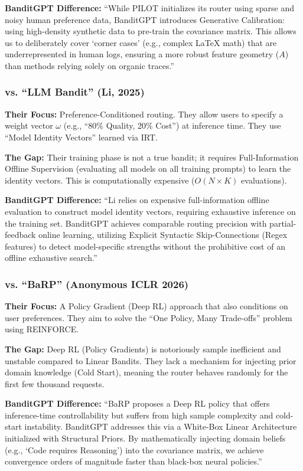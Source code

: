 \noindent \textbf{BanditGPT Difference:}
``While PILOT \cite{panda2025pilot} initializes its router using sparse and noisy human preference data, BanditGPT introduces Generative Calibration: using high-density synthetic data to pre-train the covariance matrix. This allows us to deliberately cover `corner cases' (e.g., complex LaTeX math) that are underrepresented in human logs, ensuring a more robust feature geometry ($A$) than methods relying solely on organic traces.''

\subsubsection{vs. ``LLM Bandit'' (Li, 2025)}
\noindent \textbf{Their Focus:} Preference-Conditioned routing. They allow users to specify a weight vector $\omega$ (e.g., ``80\% Quality, 20\% Cost'') at inference time. They use ``Model Identity Vectors'' learned via IRT.

\noindent \textbf{The Gap:} Their training phase is not a true bandit; it requires Full-Information Offline Supervision (evaluating all models on all training prompts) to learn the identity vectors. This is computationally expensive ($O(N \times K)$ evaluations).

\noindent \textbf{BanditGPT Difference:}
``Li \cite{li2025llmbandit} relies on expensive full-information offline evaluation to construct model identity vectors, requiring exhaustive inference on the training set. BanditGPT achieves comparable routing precision with partial-feedback online learning, utilizing Explicit Syntactic Skip-Connections (Regex features) to detect model-specific strengths without the prohibitive cost of an offline exhaustive search.''

\subsubsection{vs. ``BaRP'' (Anonymous ICLR 2026)}
\noindent \textbf{Their Focus:} A Policy Gradient (Deep RL) approach that also conditions on user preferences. They aim to solve the ``One Policy, Many Trade-offs'' problem using REINFORCE.

\noindent \textbf{The Gap:} Deep RL (Policy Gradients) is notoriously sample inefficient and unstable compared to Linear Bandits. They lack a mechanism for injecting prior domain knowledge (Cold Start), meaning the router behaves randomly for the first few thousand requests.

\noindent \textbf{BanditGPT Difference:}
``BaRP proposes a Deep RL policy that offers inference-time controllability but suffers from high sample complexity and cold-start instability. BanditGPT addresses this via a White-Box Linear Architecture initialized with Structural Priors. By mathematically injecting domain beliefs (e.g., `Code requires Reasoning') into the covariance matrix, we achieve convergence orders of magnitude faster than black-box neural policies.''

